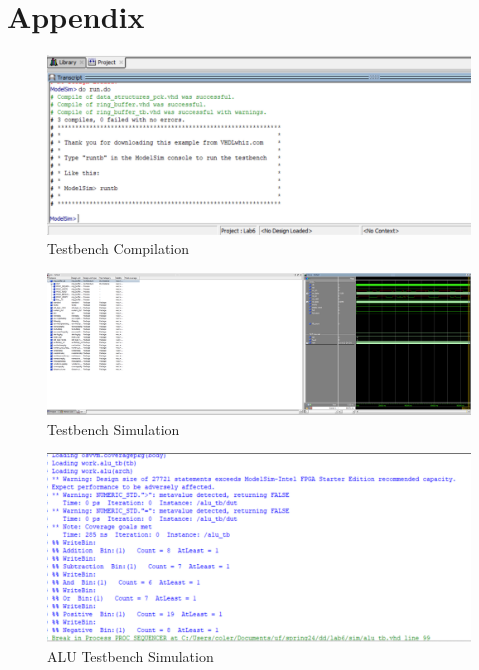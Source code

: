 \documentclass{article}
\begin{document}
\section*{Appendix}

\begin{figure}[H]
    \centering
    \includegraphics[width=\textwidth]{Part1.png}
    \caption{Testbench Compilation}
    \label{fig:ex-comp}
\end{figure}

\begin{figure}[H]
    \centering
    \includegraphics[width=\textwidth]{Part1_TB.png}
    \caption{Testbench Simulation}
    \label{fig:ex-sim}
\end{figure}

\begin{figure}[H]
    \centering
    \includegraphics[width=\textwidth]{Part2.png}
    \caption{ALU Testbench Simulation}
    \label{fig:alu-sim}
\end{figure}
\end{document}
